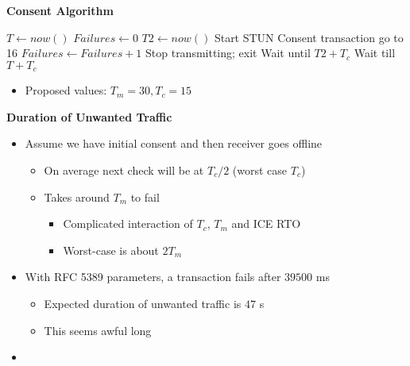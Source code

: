 \documentclass[helvetica]{seminar}
\newcommand{\heading}[1]{%
  \begin{center} 
    \large\bf 
    #1 
  \end{center} 
  \vspace{.4 in}}
\begin{document}
\begin{slide}

\heading{Consent Algorithm}

{\scriptsize
\begin{algorithmic}[1]
  \Repeat  
     \State $T \gets now()$
     \State $Failures \gets 0$
     \Repeat
     \State $T2 \gets now()$
     \State Start STUN Consent transaction
        \State go to 16
     \EndIf
     \State $Failures \gets Failures + 1$
         \State Stop transmitting; exit
     \EndIf
     \State Wait until $T2 + T_c$
     \State Wait till $T + T_c$
\end{algorithmic}
}

\begin{itemize}
\item Proposed values: $T_m = 30, T_c = 15$
\end{itemize}

\end{slide}


\begin{slide}
\heading{Duration of Unwanted Traffic}

\begin{itemize}
\item Assume we have initial consent and then receiver goes offline
  \begin{itemize}
  \item On average next check will be at $T_c/2$ (worst case $T_c$)
  \item Takes around $T_m$ to fail
    \begin{itemize}
    \item Complicated interaction of $T_c$, $T_m$ and ICE RTO
    \item Worst-case is about $2T_m$
    \end{itemize}

\end{itemize}

\item With RFC 5389 parameters, a transaction fails after $39500$ ms
  \begin{itemize}
  \item Expected duration of unwanted traffic is $47$ s
  \item This seems awful long
  \end{itemize}
\item 
\end{itemize}
\end{slide}
\end{document}
